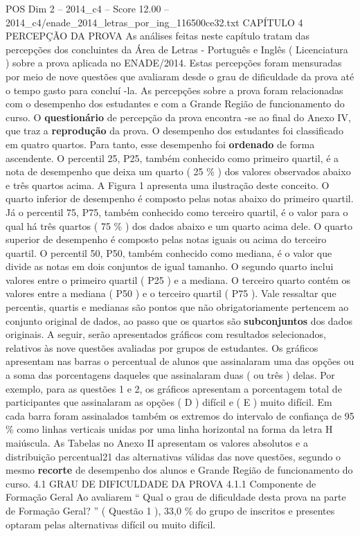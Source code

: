 \begin{textsample}{POS Dim 2 – 2014\_c4 – Score 12.00 – 2014\_c4/enade\_2014\_letras\_por\_ing\_116500ce32.txt}  \label{ex:f2_pos_115}
CAPÍTULO 4 PERCEPÇÃO DA PROVA As análises feitas neste capítulo tratam das percepções dos concluintes da Área de Letras - Português e Inglês ( Licenciatura ) sobre a prova aplicada no ENADE/2014.
Estas percepções foram mensuradas por meio de nove questões que avaliaram desde o grau de dificuldade da prova até o tempo gasto para concluí -la.
As percepções sobre a prova foram relacionadas com o desempenho dos estudantes e com a Grande Região de funcionamento do curso.
O \textbf{questionário} de percepção da prova encontra -se ao final do Anexo IV, que traz a \textbf{reprodução} da prova.
O desempenho dos estudantes foi classificado em quatro quartos.
Para tanto, esse desempenho foi \textbf{ordenado} de forma ascendente.
O percentil 25, P25, também conhecido como primeiro quartil, é a nota de desempenho que deixa um quarto ( 25 \% ) dos valores observados abaixo e três quartos acima.
A Figura 1 apresenta uma ilustração deste conceito.
O quarto inferior de desempenho é composto pelas notas abaixo do primeiro quartil.
Já o percentil 75, P75, também conhecido como terceiro quartil, é o valor para o qual há três quartos ( 75 \% ) dos dados abaixo e um quarto acima dele.
O quarto superior de desempenho é composto pelas notas iguais ou acima do terceiro quartil.
O percentil 50, P50, também conhecido como mediana, é o valor que divide as notas em dois conjuntos de igual tamanho.
O segundo quarto inclui valores entre o primeiro quartil ( P25 ) e a mediana.
O terceiro quarto contém os valores entre a mediana ( P50 ) e o terceiro quartil ( P75 ).
Vale ressaltar que percentis, quartis e medianas são pontos que não obrigatoriamente pertencem ao conjunto original de dados, ao passo que os quartos são \textbf{subconjuntos} dos dados originais.
A seguir, serão apresentados gráficos com resultados selecionados, relativos às nove questões avaliadas por grupos de estudantes.
Os gráficos apresentam nas barras o percentual de alunos que assinalaram uma das opções ou a soma das porcentagens daqueles que assinalaram duas ( ou três ) delas.
Por exemplo, para as questões 1 e 2, os gráficos apresentam a porcentagem total de participantes que assinalaram as opções ( D ) difícil e ( E ) muito difícil.
Em cada barra foram assinalados também os extremos do intervalo de confiança de 95 \% como linhas verticais unidas por uma linha horizontal na forma da letra H maiúscula.
As Tabelas no Anexo II apresentam os valores absolutos e a distribuição percentual21 das alternativas válidas das nove questões, segundo o mesmo \textbf{recorte} de desempenho dos alunos e Grande Região de funcionamento do curso. 4.1 GRAU DE DIFICULDADE DA PROVA 4.1.1 Componente de Formação Geral Ao avaliarem “ Qual o grau de dificuldade desta prova na parte de Formação Geral? ” ( Questão 1 ), 33,0 \% do grupo de inscritos e presentes optaram pelas alternativas difícil ou muito difícil.

\end{textsample}
